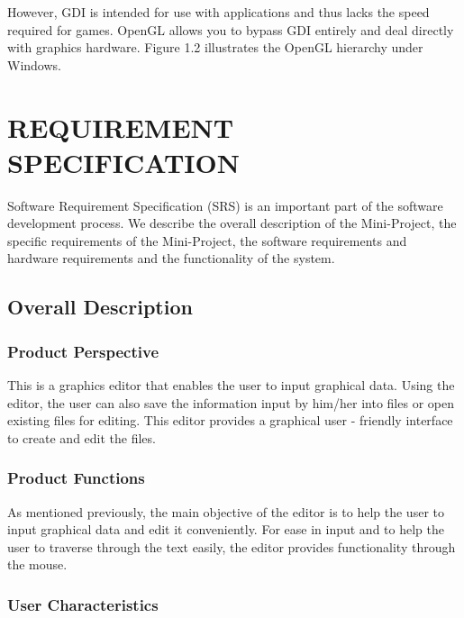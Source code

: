\documentclass[12pt]{report}
\begin{document}
 However, GDI is intended for use with applications and thus lacks the speed required for games. OpenGL allows you to bypass GDI entirely and deal directly with graphics hardware. Figure 1.2 illustrates the OpenGL hierarchy under Windows. 

\pagestyle{fancy}
\chead{}
\rfoot{\small{\thepage}}
\renewcommand{\headrulewidth}{0.4pt}
\renewcommand{\footrulewidth}{0.4pt}

\chapter{REQUIREMENT SPECIFICATION}
Software Requirement Specification (SRS) is an important part of the  software development process. We describe the overall description of the Mini-Project, the specific requirements of the Mini-Project, the software requirements and hardware requirements and the functionality of the system.
\section{Overall Description}
\subsection{Product Perspective}

This is a graphics editor that enables the user to input graphical data.  Using the editor, the user can also save the information input by him/her into files or open existing files for editing.  This editor provides a graphical user - friendly interface to create and edit the files. 

\subsection{Product Functions}

As mentioned previously, the main objective of the editor is to help the user to input graphical data and edit it conveniently. For ease in input and to help the user to traverse through the text easily, the editor provides functionality through the mouse. 

\subsection{User Characteristics}
\end{document}
